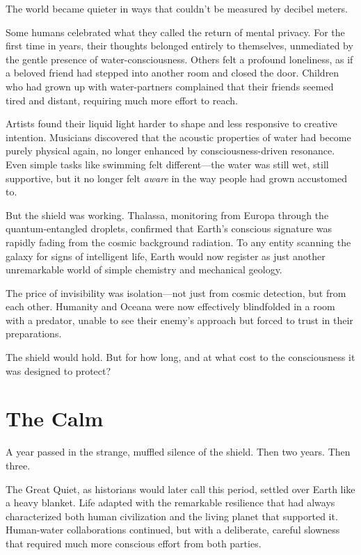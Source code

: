 The world became quieter in ways that couldn't be measured by decibel meters.

Some humans celebrated what they called the return of mental privacy. For the first time in years, their thoughts belonged entirely to themselves, unmediated by the gentle presence of water-consciousness. Others felt a profound loneliness, as if a beloved friend had stepped into another room and closed the door. Children who had grown up with water-partners complained that their friends seemed tired and distant, requiring much more effort to reach.

Artists found their liquid light harder to shape and less responsive to creative intention. Musicians discovered that the acoustic properties of water had become purely physical again, no longer enhanced by consciousness-driven resonance. Even simple tasks like swimming felt different—the water was still wet, still supportive, but it no longer felt \textit{aware} in the way people had grown accustomed to.

But the shield was working. Thalassa, monitoring from Europa through the quantum-entangled droplets, confirmed that Earth's conscious signature was rapidly fading from the cosmic background radiation. To any entity scanning the galaxy for signs of intelligent life, Earth would now register as just another unremarkable world of simple chemistry and mechanical geology.

The price of invisibility was isolation—not just from cosmic detection, but from each other. Humanity and Oceana were now effectively blindfolded in a room with a predator, unable to see their enemy's approach but forced to trust in their preparations.

The shield would hold. But for how long, and at what cost to the consciousness it was designed to protect?

\section{The Calm}

A year passed in the strange, muffled silence of the shield. Then two years. Then three.

The Great Quiet, as historians would later call this period, settled over Earth like a heavy blanket. Life adapted with the remarkable resilience that had always characterized both human civilization and the living planet that supported it. Human-water collaborations continued, but with a deliberate, careful slowness that required much more conscious effort from both parties.

